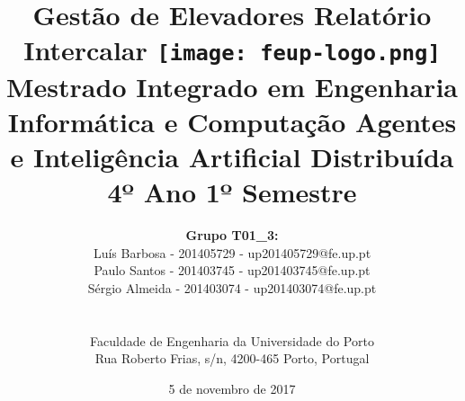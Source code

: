 \documentclass[a4paper]{article}
\begin{document}
\setlength{\textwidth}{16cm}
\setlength{\textheight}{22cm}

\title{\Huge\textbf{Gestão de Elevadores}\linebreak\linebreak\linebreak
\Large\textbf{Relatório Intercalar}\linebreak\linebreak
\linebreak\linebreak
\texttt{[image: feup-logo.png]}\linebreak\linebreak
\linebreak\linebreak
\Large{Mestrado Integrado em Engenharia Informática e Computação} \linebreak\linebreak
\Large{Agentes e Inteligência Artificial Distribuída}\linebreak
\Large{4º Ano 1º Semestre}\linebreak\linebreak
}

\author{\textbf{Grupo T01\_3:}\\ Luís  Barbosa - 201405729 - up201405729@fe.up.pt\\ Paulo Santos - 201403745 - up201403745@fe.up.pt \\ Sérgio Almeida  - 201403074 - up201403074@fe.up.pt \\\linebreak\linebreak \\
 \\ Faculdade de Engenharia da Universidade do Porto \\ Rua Roberto Frias, s/n, 4200-465 Porto, Portugal \linebreak\linebreak\linebreak
\linebreak\linebreak\vspace{1cm}}
\date{5 de novembro de 2017}
\maketitle
\thispagestyle{empty}

\end{document}
